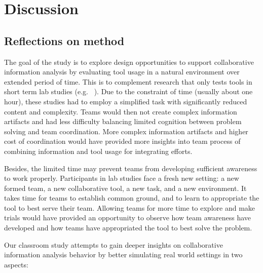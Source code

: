 \section{Discussion}\label{discussion}

\subsection{Reflections on method}\label{reflections-on-method}

The goal of the study is to explore design opportunities to support
collaborative information analysis by evaluating tool usage in a natural
environment over extended period of time. This is to complement research
that only tests tools in short term lab studies (e.g.~
\autocites{Convertino2011}{Goyal2016}). Due to the constraint of time
(usually about one hour), these studies had to employ a simplified task
with significantly reduced content and complexity. Teams would then not
create complex information artifacts and had less difficulty balancing
limited cognition between problem solving and team coordination. More
complex information artifacts and higher cost of coordination would have
provided more insights into team process of combining information and
tool usage for integrating efforts.

Besides, the limited time may prevent teams from developing sufficient
awareness to work properly. Participants in lab studies face a fresh new
setting: a new formed team, a new collaborative tool, a new task, and a
new environment. It takes time for teams to establish common ground, and
to learn to appropriate the tool to best serve their team. Allowing
teams for more time to explore and make trials would have provided an
opportunity to observe how team awareness have developed and how teams
have appropriated the tool to best solve the problem.

Our classroom study attempts to gain deeper insights on collaborative
information analysis behavior by better simulating real world settings in two aspects:

